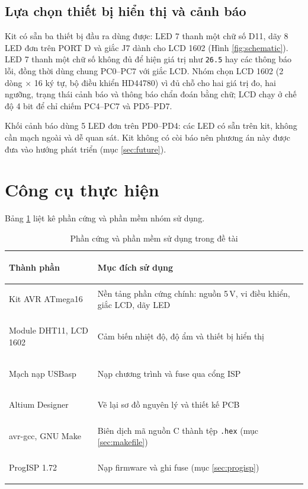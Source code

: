 \subsection{Lựa chọn thiết bị hiển thị và cảnh báo}
\label{sec:display-choice}

Kit có sẵn ba thiết bị đầu ra dùng được: LED 7 thanh một chữ số D11, dãy 8 LED đơn trên PORT D và giắc J7 dành cho LCD 1602 (Hình \ref{fig:schematic}). LED 7 thanh một chữ số không đủ để hiện giá trị như \texttt{26.5} hay các thông báo lỗi, đồng thời dùng chung PC0--PC7 với giắc LCD. Nhóm chọn LCD 1602 (2 dòng $\times$ 16 ký tự, bộ điều khiển HD44780) vì đủ chỗ cho hai giá trị đo, hai ngưỡng, trạng thái cảnh báo và thông báo chẩn đoán bằng chữ; LCD chạy ở chế độ 4 bit để chỉ chiếm PC4--PC7 và PD5--PD7.

Khối cảnh báo dùng 5 LED đơn trên PD0--PD4: các LED có sẵn trên kit, không cần mạch ngoài và dễ quan sát. Kit không có còi báo nên phương án này được đưa vào hướng phát triển (mục \ref{sec:future}).

\section{Công cụ thực hiện}

Bảng \ref{tab:tools} liệt kê phần cứng và phần mềm nhóm sử dụng.

\begin{table}[H]
\centering
\small
\caption{Phần cứng và phần mềm sử dụng trong đề tài}
\label{tab:tools}
\renewcommand{\arraystretch}{1.15}
\begin{tabularx}{\textwidth}{>{\bfseries\raggedright\arraybackslash}p{3.6cm} X}
\toprule
Thành phần & Mục đích sử dụng \\
\midrule
Kit AVR ATmega16 & Nền tảng phần cứng chính: nguồn 5\,V, vi điều khiển, giắc LCD, dãy LED \\
Module DHT11, LCD 1602 & Cảm biến nhiệt độ, độ ẩm và thiết bị hiển thị \\
Mạch nạp USBasp & Nạp chương trình và fuse qua cổng ISP \\
Altium Designer & Vẽ lại sơ đồ nguyên lý và thiết kế PCB \\
avr-gcc, GNU Make & Biên dịch mã nguồn C thành tệp \texttt{.hex} (mục \ref{sec:makefile}) \\
ProgISP 1.72 & Nạp firmware và ghi fuse (mục \ref{sec:progisp}) \\
\bottomrule
\end{tabularx}
\end{table}
